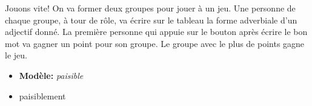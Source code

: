 \begin{frame}{Jouons vite!}
  On va former deux groupes pour jouer à un jeu.
  Une personne de chaque groupe, à tour de rôle, va écrire sur le tableau la forme adverbiale d'un adjectif donné.
  La première personne qui appuie sur le bouton après écrire le bon mot va gagner un point pour son groupe.
  Le groupe avec le plus de points gagne le jeu.
  \begin{itemize}
    \item[] \textbf{Modèle:} \emph{paisible}
    \item paisiblement
  \end{itemize}
\end{frame}